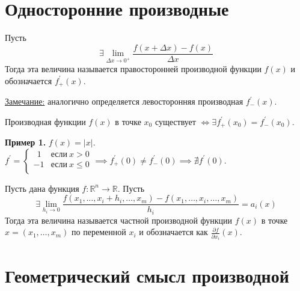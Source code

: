 \documentclass{article}
\begin{document}
\section*{Односторонние производные}

\begin{definition}
    Пусть \[\exists \lim\limits_{\Delta x \to 0^+} \frac{f(x + \Delta x) - f(x)}{\Delta x}\]
    Тогда эта величина называется правосторонней производной функции \(f(x)\) и обозначается \(f^{\prime}_{+}(x)\). 
\end{definition}
\noindent
\underline{Замечание:} аналогично определяется левосторонняя производная \(f^{\prime}_{-}(x)\).

\begin{claim}
    Производная функции \(f(x)\) в точке \(x_0\) существует \(\iff \exists f^{\prime}_{+}(x_0) = f^{\prime}_{-}(x_0)\). 
\end{claim}
\noindent
\textbf{Пример 1.} \(f(x) = \left\vert x \right\vert\). \(\displaystyle f^{\prime} =
\begin{cases}
    \ \ 1 & \text{если}\ x > 0\\
    -1 & \text{если}\ x \leq 0\\  
\end{cases} \implies 
f^{\prime}_{+}(0) \neq f^{\prime}_{-}(0) \implies \nexists f^{\prime}(0)\).

\begin{definition}
    Пусть дана функция \(f: \mathbb{R}^n \to \mathbb{R}\). Пусть
    \[
        \exists \lim\limits_{h_{i} \to 0} \frac{f(x_{1}, \dots , x_{i} + h_{i}, \dots , x_{m}) - f(x_{1}, \dots, x_{i}, \dots, x_{m})}{h_{i}} = a_{i}(x)
    \]
    Тогда эта величина называется частной производной функции \(f(x)\) в точке \(x = (x_{1}, \dots, x_{m})\) по переменной \(x_{i}\) и обозначается как \(\displaystyle \frac{\partial f}{\partial x_{i}}(x)\). 
\end{definition}

\section*{Геометрический смысл производной}
\end{document}
